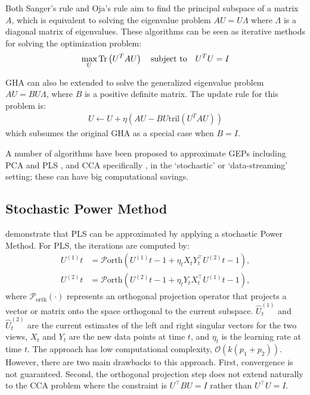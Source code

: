 Both Sanger's rule and Oja's rule aim to find the principal subspace of a matrix \( A \), which is equivalent to solving the eigenvalue problem \( A U = U \Lambda \) where \( \Lambda \) is a diagonal matrix of eigenvalues. These algorithms can be seen as iterative methods for solving the optimization problem:
\begin{align}
\max_{U} \operatorname{Tr} \left(U^T A U\right) \quad \text{subject to} \quad U^T U = I
\end{align}

GHA can also be extended to solve the generalized eigenvalue problem $A U = B U \Lambda$, where $B$ is a positive definite matrix\citep{chen2019constrained}. The update rule for this problem is:
\begin{align}
U \leftarrow U + \eta \left( A U - B U \text{tril}(U^T A U) \right)
\end{align}
which subsumes the original GHA as a special case when $B=I$.

A number of algorithms have been proposed to approximate GEPs including PCA and PLS \citep{arora2012stochastic}, and CCA specifically \citep{bhatia2018gen}, in the `stochastic' or `data-streaming' setting; these can have big computational savings.

\subsection{Stochastic Power Method}
\citet{arora2016stochastic} demonstrate that PLS can be approximated by applying a stochastic Power Method. For PLS, the iterations are computed by:
\begin{align*}
U^{(1)}t &= \mathcal{P}{\text{orth}} \left( U^{(1)}{t-1} + \eta_t X_t Y_t^\top U^{(2)}{t-1} \right), \\
U^{(2)}t &= \mathcal{P}{\text{orth}} \left( U^{(2)}{t-1} + \eta_t Y_t X_t^\top U^{(1)}{t-1} \right),
\end{align*}
where \( \mathcal{P}_{\text{orth}}(\cdot) \) represents an orthogonal projection operator that projects a vector or matrix onto the space orthogonal to the current subspace. \( \hat{U}^{(1)}_t \) and \( \hat{U}^{(2)}_t \) are the current estimates of the left and right singular vectors for the two views, \( X_t \) and \( Y_t \) are the new data points at time \( t \), and \( \eta_t \) is the learning rate at time \( t \).
The approach has low computational complexity, $\mathcal{O}(k(p_1+ p_2))$.
However, there are two main drawbacks to this approach.
First, convergence is not guaranteed.
Second, the orthogonal projection step does not extend naturally to the CCA problem where the constraint is \( U^\top B U = I \) rather than \( U^\top U = I \).

